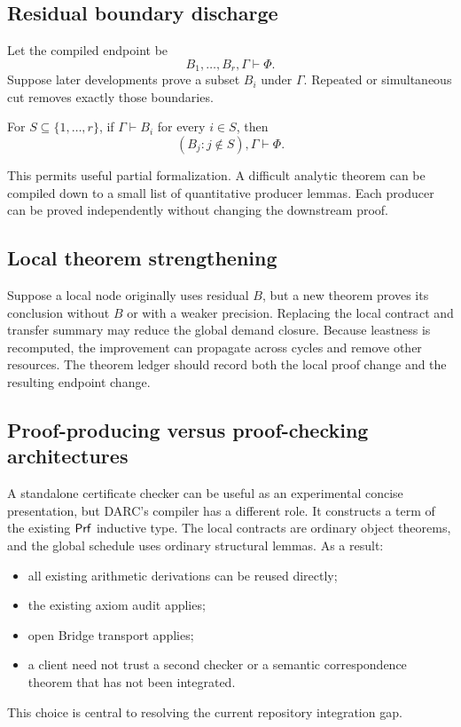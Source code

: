 \subsection{Residual boundary discharge}

Let the compiled endpoint be
\[
  B_1,\ldots,B_r,\Gamma\vdash\Phi.
\]
Suppose later developments prove a subset \(B_i\) under \(\Gamma\).  Repeated
or simultaneous cut removes exactly those boundaries.

\begin{corollary}
\label{cor:incremental-discharge}
For \(S\subseteq\{1,\ldots,r\}\), if
\(\Gamma\vdash B_i\) for every \(i\in S\), then
\[
  (B_j:j\notin S),\Gamma\vdash\Phi.
\]
\end{corollary}

This permits useful partial formalization.  A difficult analytic theorem can
be compiled down to a small list of quantitative producer lemmas.  Each
producer can be proved independently without changing the downstream proof.

\subsection{Local theorem strengthening}

Suppose a local node originally uses residual \(B\), but a new theorem proves
its conclusion without \(B\) or with a weaker precision.  Replacing the local
contract and transfer summary may reduce the global demand closure.  Because
leastness is recomputed, the improvement can propagate across cycles and
remove other resources.  The theorem ledger should record both the local
proof change and the resulting endpoint change.

\subsection{Proof-producing versus proof-checking architectures}

A standalone certificate checker can be useful as an experimental concise
presentation, but DARC's compiler has a different role.  It constructs a term
of the existing \(\mathsf{Prf}\) inductive type.  The local contracts are ordinary
object theorems, and the global schedule uses ordinary structural lemmas.  As a
result:
\begin{itemize}
  \item all existing arithmetic derivations can be reused directly;
  \item the existing axiom audit applies;
  \item open Bridge transport applies;
  \item a client need not trust a second checker or a semantic correspondence
        theorem that has not been integrated.
\end{itemize}
This choice is central to resolving the current repository integration gap.
